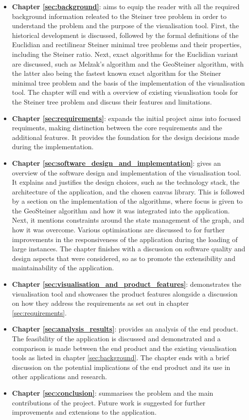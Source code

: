\documentclass{l4proj}
\begin{document}
\begin{itemize}
    \item \textbf{Chapter \ref{sec:background}}: aims to equip the reader with all the required background information releated to the Steiner tree problem in order to understand the problem and the purpose of the visualisation tool. First, the historical development is discussed, followed by the formal definitions of the Euclidian and rectilinear Steiner minimal tree problems and their properties, including the Steiner ratio. Next, exact algorithms for the Euclidian variant are discussed, such as Melzak's algorithm and the GeoSteiner algorithm, with the latter also being the fastest known exact algorithm for the Steiner minimal tree problem and the basis of the implementation of the visualisation tool. The chapter will end with a overview of existing visualisation tools for the Steiner tree problem and discuss their features and limitations.
    \item \textbf{Chapter \ref{sec:requirements}}: expands the initial project aims into focused requiments, making distinction between the core requirements and the additional features. It provides the foundation for the design decisions made during the implementation.
    \item \textbf{Chapter \ref{sec:software_design_and_implementation}}: gives an overview of the software design and implementation of the visualisation tool. It explains and justifies the design choices, such as the technology stack, the architecture of the application, and the chosen canvas library. This is followed by a section on the implementation of the algorithms, where focus is given to the GeoSteiner algorithm and how it was integrated into the application. Next, it mentions constraints around the state management of the graph, and how it was overcome. Various optimisations are discussed to for further improvements in the responsiveness of the application during the loading of large instances. The chapter finishes with a discussion on software quality and design aspects that were considered, so as to promote the extensibility and maintainability of the application.
    \item \textbf{Chapter \ref{sec:visualisation_and_product_features}}: demonstrates the visualisation tool and showcases the product features alongside a discussion on how they address the requirements as set out in chapter \ref{sec:requirements}.
    \item \textbf{Chapter \ref{sec:analysis_results}}: provides an analysis of the end product. The feasibility of the application is discussed and demonstrated and a comparison is made between the end product and the existing visualisation tools as listed in chapter \ref{sec:background}. The chapter ends with a brief discussion on the potential implications of the end product and its use in other applications and research.
    \item \textbf{Chapter \ref{sec:conclusion}}: summarises the problem and the main contributions of the project. Future work is suggested for further improvements and extensions to the application.
\end{itemize}
\end{document}
